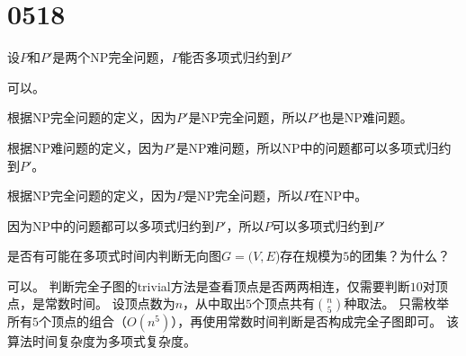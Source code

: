 \section{0518}\label{sec:0518}
\begin{questions}
    \question 设$P$和$P'$是两个NP完全问题，$P$能否多项式归约到$P'$

    \begin{solution}

        可以。

        根据NP完全问题的定义，因为$P'$是NP完全问题，所以$P'$也是NP难问题。

        根据NP难问题的定义，因为$P'$是NP难问题，所以NP中的问题都可以多项式归约到$P'$。

        根据NP完全问题的定义，因为$P$是NP完全问题，所以$P$在NP中。

        因为NP中的问题都可以多项式归约到$P'$，所以$P$可以多项式归约到$P'$

    \end{solution}


    \question 是否有可能在多项式时间内判断无向图$G=(V,E$)存在规模为$5$的团集？为什么？

    \begin{solution}
        可以。
        判断完全子图的trivial方法是查看顶点是否两两相连，仅需要判断$10$对顶点，是常数时间。
        设顶点数为$n$，从中取出$5$个顶点共有$\binom{n}{5}$种取法。
        只需枚举所有$5$个顶点的组合（$O(n^5)$），再使用常数时间判断是否构成完全子图即可。
        该算法时间复杂度为多项式复杂度。
    \end{solution}

\end{questions}
